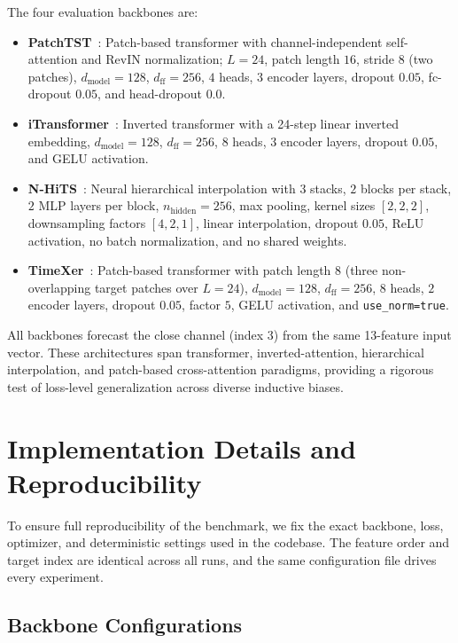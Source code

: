 \documentclass[11pt]{article}
\begin{document}
The four evaluation backbones are:
\begin{itemize}
\item \textbf{PatchTST}~\citep{patchtst}: Patch-based transformer with
  channel-independent self-attention and RevIN normalization;
  $L = 24$, patch length $16$, stride $8$ (two patches),
  $d_{\mathrm{model}} = 128$, $d_{\mathrm{ff}} = 256$,
  $4$ heads, $3$ encoder layers, dropout $0.05$,
  fc-dropout $0.05$, and head-dropout $0.0$.
\item \textbf{iTransformer}~\citep{itransformer}: Inverted transformer
  with a 24-step linear inverted embedding, $d_{\mathrm{model}} = 128$,
  $d_{\mathrm{ff}} = 256$, $8$ heads, $3$ encoder layers, dropout
  $0.05$, and GELU activation.
\item \textbf{N-HiTS}~\citep{challu2023nhits}: Neural hierarchical
  interpolation with $3$ stacks, $2$ blocks per stack, $2$ MLP layers
  per block, $n_{\mathrm{hidden}} = 256$, max pooling, kernel sizes
  $[2,2,2]$, downsampling factors $[4,2,1]$, linear interpolation,
  dropout $0.05$, ReLU activation, no batch normalization, and no
  shared weights.
\item \textbf{TimeXer}~\citep{timexer2024}: Patch-based transformer with patch length
  $8$ (three non-overlapping target patches over $L=24$),
  $d_{\mathrm{model}} = 128$, $d_{\mathrm{ff}} = 256$,
  $8$ heads, $2$ encoder layers, dropout $0.05$,
  factor $5$, GELU activation, and \texttt{use\_norm=true}.
\end{itemize}
All backbones forecast the close channel (index 3) from the same
13-feature input vector. These architectures span transformer,
inverted-attention, hierarchical interpolation, and patch-based
cross-attention paradigms, providing a rigorous test of loss-level
generalization across diverse inductive biases.

\section{Implementation Details and Reproducibility}
\label{sec:reproducibility}

To ensure full reproducibility of the benchmark, we fix the exact
backbone, loss, optimizer, and deterministic settings used in the
codebase. The feature order and target index are identical across
all runs, and the same configuration file drives every experiment.

\subsection{Backbone Configurations}
\end{document}
